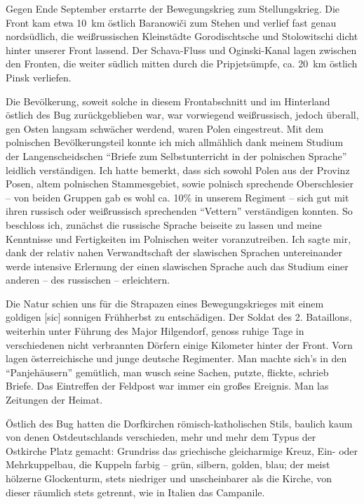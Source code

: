 \documentclass[a5paper,pagesize,10pt,twoside=true]{scrbook}
\begin{document}
Gegen Ende September erstarrte der Bewegungskrieg zum Stellungskrieg. Die Front kam etwa 10~km östlich Baranowiči zum Stehen und verlief fast genau nordsüdlich, die weißrussischen Kleinstädte Gorodischtsche und Stolowitschi dicht hinter unserer Front lassend. Der Schava-Fluss und Oginski-Kanal lagen zwischen den Fronten, die weiter südlich mitten durch die Pripjet\-sümpfe, ca. 20~km östlich Pinsk verliefen.

Die Bevölkerung, soweit solche in diesem Frontabschnitt und im Hinterland östlich des Bug zurückgeblieben war, war vorwiegend weißrussisch, jedoch überall, gen Osten langsam schwächer werdend, waren Polen eingestreut. Mit dem polnischen Bevölkerungsteil konnte ich mich allmählich dank meinem Studium der Langenscheidschen \enquote{Briefe zum Selbstunterricht in der polnischen Sprache} leidlich verständigen. Ich hatte bemerkt, dass sich sowohl Polen aus der Provinz Posen, altem polnischen Stammesgebiet, sowie polnisch sprechende Oberschlesier -- von beiden Gruppen gab es wohl ca. 10\% in unserem Regiment -- sich gut mit ihren russisch oder weißrussisch sprechenden \enquote{Vettern} verständigen konnten. So beschloss ich, zunächst die russische Sprache beiseite zu lassen und meine Kenntnisse und Fertigkeiten im Polnischen weiter voranzutreiben. Ich sagte mir, dank der relativ nahen Verwandtschaft der slawischen Sprachen untereinander werde intensive Erlernung der einen slawischen Sprache auch das Studium einer anderen -- des russischen -- erleichtern.

Die Natur schien uns für die Strapazen eines Bewegungskrieges mit einem goldigen [sic] sonnigen Frühherbst zu entschädigen. Der Soldat des 2. Bataillons, weiterhin unter Führung des Major Hilgendorf, genoss ruhige Tage in verschiedenen nicht verbrannten Dörfern einige Kilometer hinter der Front. Vorn lagen österreichische und junge deutsche Regimenter. Man machte sich's in den \enquote{Panjehäusern} gemütlich, man wusch seine Sachen, putzte, flickte, schrieb Briefe. Das Eintreffen der Feldpost war immer ein großes Ereignis. Man las Zeitungen der Heimat.

Östlich des Bug hatten die Dorfkirchen römisch-katholischen Stils, baulich kaum von denen Ostdeutschlands verschieden, mehr und mehr dem Typus der Ostkirche Platz gemacht: Grundriss das griechische gleicharmige Kreuz, Ein- oder Mehrkuppelbau, die Kuppeln farbig -- grün, silbern, golden, blau; der meist hölzerne Glockenturm, stets niedriger und unscheinbarer als die Kirche, von dieser räumlich stets getrennt, wie in Italien das Campanile.
\end{document}
